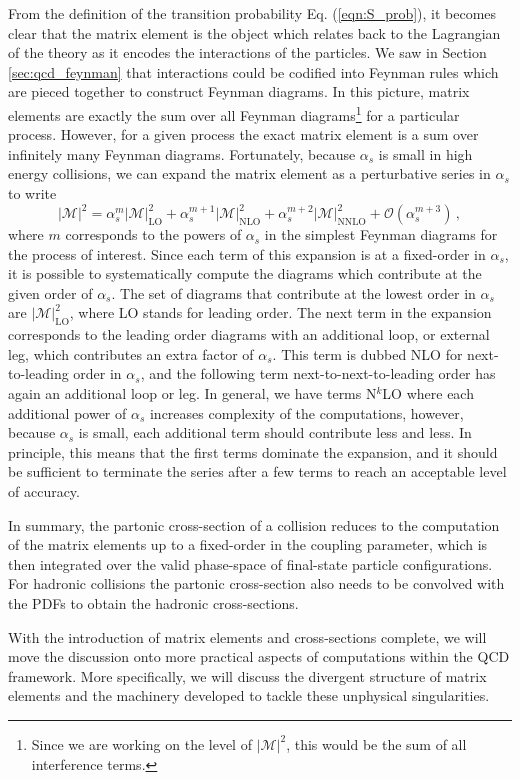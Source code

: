 \documentclass[main.tex]{subfiles}
\begin{document}
    From the definition of the transition probability
    Eq. (\ref{eqn:S_prob}), it becomes clear
    that the matrix element is the object which
    relates back to the Lagrangian of the theory
    as it encodes the interactions of the particles.
    We saw in Section \ref{sec:qcd_feynman} that
    interactions could be codified into Feynman
    rules which are pieced together to construct
    Feynman diagrams. In this picture, matrix elements
    are exactly the sum over all Feynman diagrams\footnote{Since we are working on the level
    of $|\mathcal{M}|^{2}$, this would
    be the sum of all interference terms.}
    for a particular process. However, for a given
    process the exact matrix element is a sum over
    infinitely many Feynman diagrams.
    Fortunately, because $\alpha_{s}$
    is small in high energy collisions, we can expand
    the matrix element as a perturbative series in
    $\alpha_{s}$ to write
    \begin{equation}\label{eqn:matrix_element}
        |\mathcal{M}|^{2} =  \alpha_{s}^{m} |\mathcal{M}|^{2}_{\mathrm{LO}} + \alpha_{s}^{m+1} |\mathcal{M}|^{2}_{\mathrm{NLO}} + \alpha_{s}^{m+2} |\mathcal{M}|^{2}_{\mathrm{NNLO}} + \mathcal{O}(\alpha_{s}^{m+3}) \, ,
    \end{equation}
    where $m$ corresponds to the powers of $\alpha_{s}$
    in the simplest Feynman diagrams
    for the process of interest.
    Since each term of this expansion is at a fixed-order
    in $\alpha_{s}$, it is possible to systematically
    compute the diagrams which contribute at the given order of $\alpha_{s}$.
    The set of diagrams that contribute at the lowest
    order in $\alpha_{s}$ are $|\mathcal{M}|^{2}_{\mathrm{LO}}$,
    where LO stands for leading order. The next term
    in the expansion corresponds to the leading order
    diagrams with an additional loop, or external leg,
    which contributes an extra factor of $\alpha_{s}$.
    This term is dubbed NLO for next-to-leading order
    in $\alpha_{s}$, and the following term
    next-to-next-to-leading order has again an additional
    loop or leg. In general, we have terms
    N$^{k}$LO where each additional power of $\alpha_{s}$
    increases complexity of the computations, however,
    because $\alpha_{s}$ is small, each additional term
    should contribute less and less.
    In principle, this means that the first terms dominate the expansion,
    and it should be sufficient to terminate the series after
    a few terms to reach an acceptable level of accuracy.

    In summary, the partonic cross-section of a collision
    reduces to the computation of the matrix elements
    up to a fixed-order in the coupling parameter,
    which is then integrated over the valid phase-space of
    final-state particle configurations. For hadronic
    collisions the partonic cross-section also needs to
    be convolved with the PDFs to obtain the hadronic
    cross-sections.

    With the introduction of matrix elements and
    cross-sections complete, we will move the discussion onto
    more practical aspects of computations within the
    QCD framework. More specifically, we will discuss
    the divergent structure of matrix elements
    and the machinery developed to tackle these
    unphysical singularities.
\end{document}
